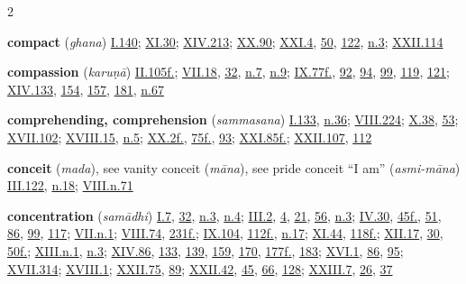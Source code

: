 \begin{multicols}{2}
\begin{vismHanging}
\par\textbf{compact} (\emph{ghana}) \hyperlink{I.140}{I.140}{}; \hyperlink{XI.30}{XI.30}{}; \hyperlink{XIV.213}{XIV.213}{}; \hyperlink{XX.90}{XX.90}{}; \hyperlink{XXI.4}{XXI.4}{}, \hyperlink{XXI.50}{50}{}, \hyperlink{XXI.122}{122}{}, \hyperlink{XXI.n3}{n.3}{}; \hyperlink{XXII.114}{XXII.114}{}
\par\textbf{compassion} (\emph{karuṇā}) \hyperlink{II.105}{II.105f.}{}; \hyperlink{VII.18}{VII.18}{}, \hyperlink{VII.32}{32}{}, \hyperlink{VII.n7}{n.7}{}, \hyperlink{VII.n9}{n.9}{}; \hyperlink{IX.77}{IX.77f.}{}, \hyperlink{IX.92}{92}{}, \hyperlink{IX.94}{94}{}, \hyperlink{IX.99}{99}{}, \hyperlink{IX.119}{119}{}, \hyperlink{IX.121}{121}{}; \hyperlink{XIV.133}{XIV.133}{}, \hyperlink{XIV.154}{154}{}, \hyperlink{XIV.157}{157}{}, \hyperlink{XIV.181}{181}{}, \hyperlink{XIV.n67}{n.67}{}
\par\textbf{comprehending, comprehension} (\emph{sammasana}) \hyperlink{I.133}{I.133}{}, \hyperlink{I.n36}{n.36}{}; \hyperlink{VIII.224}{VIII.224}{}; \hyperlink{X.38}{X.38}{}, \hyperlink{X.53}{53}{}; \hyperlink{XVII.102}{XVII.102}{}; \hyperlink{XVIII.15}{XVIII.15}{}, \hyperlink{XVIII.n5}{n.5}{}; \hyperlink{XX.2}{XX.2f.}{}, \hyperlink{XX.75}{75f.}{}, \hyperlink{XX.93}{93}{}; \hyperlink{XXI.85}{XXI.85f.}{}; \hyperlink{XXII.107}{XXII.107}{}, \hyperlink{XXII.112}{112}{}
\par\textbf{conceit} (\emph{mada}), see vanity conceit (\emph{māna}), see pride conceit “I am” (\emph{asmi-māna}) \hyperlink{III.122}{III.122}{}, \hyperlink{III.n18}{n.18}{}; \hyperlink{VIII.n71}{VIII.n.71}{}
\par\textbf{concentration} (\emph{samādhi}) \hyperlink{I.7}{I.7}{}, \hyperlink{I.32}{32}{}, \hyperlink{I.n3}{n.3}{}, \hyperlink{I.n4}{n.4}{}; \hyperlink{III.2}{III.2}{}, \hyperlink{III.4}{4}{}, \hyperlink{III.21}{21}{}, \hyperlink{III.56}{56}{}, \hyperlink{III.n3}{n.3}{}; \hyperlink{IV.30}{IV.30}{}, \hyperlink{IV.45}{45f.}{}, \hyperlink{IV.51}{51}{}, \hyperlink{IV.86}{86}{}, \hyperlink{IV.99}{99}{}, \hyperlink{IV.117}{117}{}; \hyperlink{VII.n1}{VII.n.1}{}; \hyperlink{VIII.74}{VIII.74}{}, \hyperlink{VIII.231}{231f.}{}; \hyperlink{IX.104}{IX.104}{}, \hyperlink{IX.112}{112f.}{}, \hyperlink{IX.n17}{n.17}{}; \hyperlink{XI.44}{XI.44}{}, \hyperlink{XI.118}{118f.}{}; \hyperlink{XII.17}{XII.17}{}, \hyperlink{XII.30}{30}{}, \hyperlink{XII.50}{50f.}{}; \hyperlink{XIII.n1}{XIII.n.1}{}, \hyperlink{XIII.n3}{n.3}{}; \hyperlink{XIV.86}{XIV.86}{}, \hyperlink{XIV.133}{133}{}, \hyperlink{XIV.139}{139}{}, \hyperlink{XIV.159}{159}{}, \hyperlink{XIV.170}{170}{}, \hyperlink{XIV.177}{177f.}{}, \hyperlink{XIV.183}{183}{}; \hyperlink{XVI.1}{XVI.1}{}, \hyperlink{XVI.86}{86}{}, \hyperlink{XVI.95}{95}{}; \hyperlink{XVII.314}{XVII.314}{}; \hyperlink{XVIII.1}{XVIII.1}{}; \hyperlink{XXII.75}{XXII.75}{}, \hyperlink{XXII.89}{89}{}; \hyperlink{XXII.42}{XXII.42}{}, \hyperlink{XXII.45}{45}{}, \hyperlink{XXII.66}{66}{}, \hyperlink{XXII.128}{128}{}; \hyperlink{XXIII.7}{XXIII.7}{}, \hyperlink{XXIII.26}{26}{}, \hyperlink{XXIII.37}{37}{}

\end{vismHanging}
\end{multicols}
